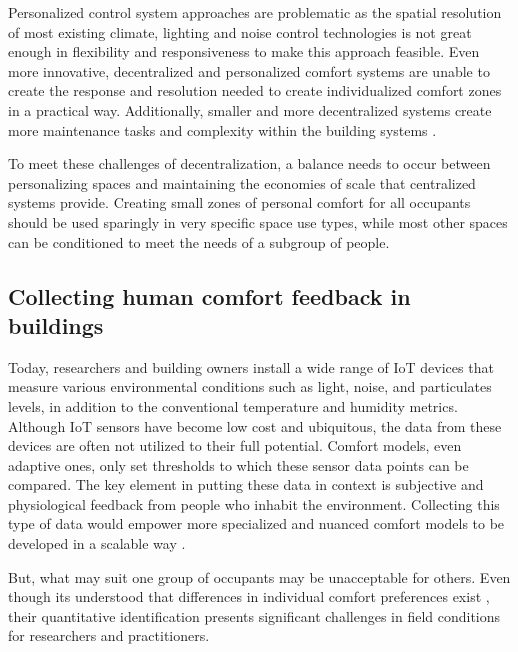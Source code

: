 \documentclass[]{interact}
\theoremstyle{plain}%
\theoremstyle{definition}
\theoremstyle{remark}
\begin{document}
Personalized control system approaches are problematic as the spatial resolution of most existing climate, lighting and noise control technologies is not great enough in flexibility and responsiveness to make this approach feasible. Even more innovative, decentralized and personalized comfort systems are unable to create the response and resolution needed to create individualized comfort zones in a practical way. Additionally, smaller and more decentralized systems create more maintenance tasks and complexity within the building systems \citep{VESELY2017223}.

To meet these challenges of decentralization, a balance needs to occur between personalizing spaces and maintaining the economies of scale that centralized systems provide. Creating small zones of personal comfort for all occupants should be used sparingly in very specific space use types, while most other spaces can be conditioned to meet the needs of a subgroup of people. 




\subsection{Collecting human comfort feedback in buildings}
Today, researchers and building owners install a wide range of IoT devices that measure various environmental conditions such as light, noise, and particulates levels, in addition to the conventional temperature and humidity metrics. 
Although IoT sensors have become low cost and ubiquitous, the data from these devices are often not utilized to their full potential. Comfort models, even adaptive ones, only set thresholds to which these sensor data points can be compared. The key element in putting these data in context is subjective and physiological feedback from people who inhabit the environment. Collecting this type of data would empower more specialized and nuanced comfort models to be developed in a scalable way \cite{ltpaper}.

But, what may suit one group of occupants may be unacceptable for others. Even though its understood that differences in individual comfort preferences exist \cite{WANG2018181}, their quantitative identification presents significant challenges in field conditions for researchers and practitioners.
\end{document}

